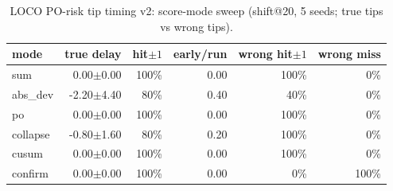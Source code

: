 \begin{table}[h]
\centering
\caption{LOCO PO-risk tip timing v2: score-mode sweep (shift@20, 5 seeds; true tips vs wrong tips).}
\label{tab:loco-v2}
\begin{tabular}{lrrrrr}
\toprule
mode & true delay & hit$\pm1$ & early/run & wrong hit$\pm1$ & wrong miss \\
\midrule
sum & 0.00$\pm$0.00 & 100\% & 0.00 & 100\% & 0\% \\
abs_dev & -2.20$\pm$4.40 & 80\% & 0.40 & 40\% & 0\% \\
po & 0.00$\pm$0.00 & 100\% & 0.00 & 100\% & 0\% \\
collapse & -0.80$\pm$1.60 & 80\% & 0.20 & 100\% & 0\% \\
cusum & 0.00$\pm$0.00 & 100\% & 0.00 & 100\% & 0\% \\
confirm & 0.00$\pm$0.00 & 100\% & 0.00 & 0\% & 100\% \\
\bottomrule
\end{tabular}
\end{table}

